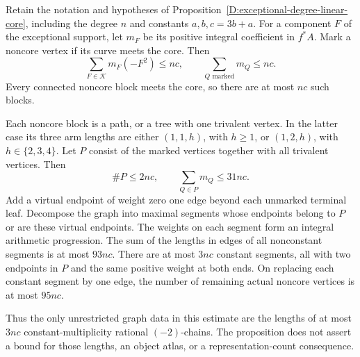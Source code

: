 \begin{proposition}
\label{D:weighted-exceptional-chain-compression}
Retain the notation and hypotheses of
Proposition~\ref{D:exceptional-degree-linear-core}, including the
degree $n$ and constants $a,b,c=3b+a$.  For a component $F$ of the
exceptional support, let $m_F$ be its positive integral coefficient
in $f^*A$.  Mark a noncore vertex if its curve meets the core.
Then
\[
 \sum_{F\in\mathcal K}m_F(-F^2)\le nc,
 \qquad
 \sum_{Q\text{ marked}}m_Q\le nc.                    \tag{D.WC.1}
\]
Every connected noncore block meets the core, so there are at most
$nc$ such blocks.

Each noncore block is a path, or a tree with one trivalent vertex.
In the latter case its three arm lengths are either $(1,1,h)$,
with $h\ge1$, or $(1,2,h)$, with $h\in\{2,3,4\}$.  Let $P$ consist
of the marked vertices together with all trivalent vertices.
Then
\[
                 \#P\le2nc,
                 \qquad \sum_{Q\in P}m_Q\le31nc.      \tag{D.WC.2}
\]
Add a virtual endpoint of weight zero one edge beyond each unmarked
terminal leaf.  Decompose the graph into maximal segments whose
endpoints belong to $P$ or are these virtual endpoints.  The
weights on each segment form an integral arithmetic progression.
The sum of the lengths in edges of all nonconstant segments is
at most $93nc$.  There are at most $3nc$ constant segments, all
with two endpoints in $P$ and the same positive weight at both
ends.  On replacing each constant segment by one edge, the number
of remaining actual noncore vertices is at most $95nc$.

Thus the only unrestricted graph data in this estimate are the
lengths of at most $3nc$ constant-multiplicity rational
$(-2)$-chains.  The proposition does not assert a bound for those
lengths, an object atlas, or a representation-count consequence.
\end{proposition}

